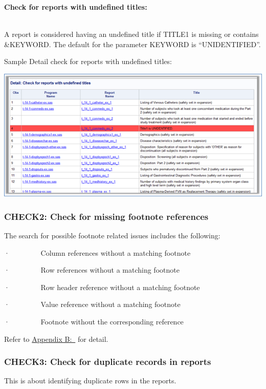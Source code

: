 \documentclass[
  letterpaper,
  DIV=11,
  numbers=noendperiod]{scrartcl}
\begin{document}
\textbf{Check for reports with undefined titles:}\\
\strut \\
A report is considered having an undefined title if TITLE1 is missing or
contains \&KEYWORD. The default for the parameter KEYWORD is
``UNIDENTIFIED''.

Sample Detail check for reports with undefined titles:

\includegraphics{image/Picture4.png}

\hypertarget{check2-check-for-missing-footnote-references}{%
\subsubsection{CHECK2: Check for missing footnote
references}\label{check2-check-for-missing-footnote-references}}

The search for possible footnote related issues includes the following:

·~~~~~~~~ Column references without a matching footnote

·~~~~~~~~ Row references without a matching footnote

·~~~~~~~~ Row header reference without a matching footnote

·~~~~~~~~ Value reference without a matching footnote

·~~~~~~~~ Footnote without the corresponding reference~

Refer to \protect\hyperlink{appendix-b}{Appendix B:~} for detail.~

\hypertarget{check3-check-for-duplicate-records-in-reports}{%
\subsubsection{CHECK3: Check for duplicate records in
reports}\label{check3-check-for-duplicate-records-in-reports}}

This is about identifying duplicate rows in the reports.
\end{document}
